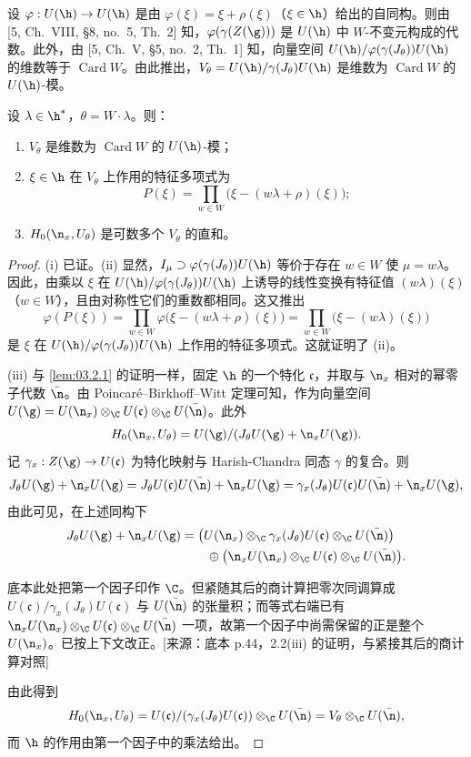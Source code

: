 设 $\varphi:U(\h)\to U(\h)$ 是由 $\varphi(\xi)=\xi+\rho(\xi)$（$\xi\in\h$）给出的自同构。则由 [5, Ch.~VIII, \S8, no.~5, Th.~2] 知，$\varphi(\gamma(Z(\g)))$ 是 $U(\h)$ 中 $W$-不变元构成的代数。此外，由 [5, Ch.~V, \S5, no.~2, Th.~1] 知，向量空间 $U(\h)/\varphi(\gamma(J_\theta))U(\h)$ 的维数等于 $\operatorname{Card}W$。由此推出，$V_\theta=U(\h)/\gamma(J_\theta)U(\h)$ 是维数为 $\operatorname{Card}W$ 的 $U(\h)$-模。

\begin{lemma}\label{lem:03.2.2}
设 $\lambda\in\h^*$，$\theta=W\cdot\lambda$。则：
\begin{enumerate}[label=(\roman*)]
\item $V_\theta$ 是维数为 $\operatorname{Card}W$ 的 $U(\h)$-模；
\item $\xi\in\h$ 在 $V_\theta$ 上作用的特征多项式为
$$P(\xi)=\prod_{w\in W}\bigl(\xi-(w\lambda+\rho)(\xi)\bigr);$$
\item $H_0(\n_x,U_\theta)$ 是可数多个 $V_\theta$ 的直和。
\end{enumerate}
\end{lemma}

\begin{proof}
(i) 已证。(ii) 显然，$I_\mu\supset\varphi(\gamma(J_\theta))U(\h)$ 等价于存在 $w\in W$ 使 $\mu=w\lambda$。因此，由乘以 $\xi$ 在 $U(\h)/\varphi(\gamma(J_\theta))U(\h)$ 上诱导的线性变换有特征值 $(w\lambda)(\xi)$（$w\in W$），且由对称性它们的重数都相同。这又推出
$$\varphi(P(\xi))=\prod_{w\in W}\varphi\bigl(\xi-(w\lambda+\rho)(\xi)\bigr)=\prod_{w\in W}\bigl(\xi-(w\lambda)(\xi)\bigr)$$
是 $\xi$ 在 $U(\h)/\varphi(\gamma(J_\theta))U(\h)$ 上作用的特征多项式。这就证明了 (ii)。

(iii) 与 \ref{lem:03.2.1} 的证明一样，固定 $\h$ 的一个特化 $\mathfrak{c}$，并取与 $\n_x$ 相对的幂零子代数 $\bar{\n}$。由 Poincaré--Birkhoff--Witt 定理可知，作为向量空间 $U(\g)=U(\n_x)\otimes_\C U(\mathfrak{c})\otimes_\C U(\bar{\n})$。此外
$$H_0(\n_x,U_\theta)=U(\g)/(J_\theta U(\g)+\n_xU(\g)).$$
记 $\gamma_x:Z(\g)\to U(\mathfrak{c})$ 为特化映射与 Harish-Chandra 同态 $\gamma$ 的复合。则
$$J_\theta U(\g)+\n_xU(\g)=J_\theta U(\mathfrak{c})U(\bar{\n})+\n_xU(\g)=\gamma_x(J_\theta)U(\mathfrak{c})U(\bar{\n})+\n_xU(\g),$$
由此可见，在上述同构下
\begin{align*}
J_\theta U(\g)+\n_xU(\g)
&=\bigl(U(\n_x)\otimes_\C\gamma_x(J_\theta)U(\mathfrak{c})\otimes_\C U(\bar{\n})\bigr)\\
&\qquad\oplus\bigl(\n_xU(\n_x)\otimes_\C U(\mathfrak{c})\otimes_\C U(\bar{\n})\bigr).
\end{align*}
\begin{annote}
底本此处把第一个因子印作 $\C$。但紧随其后的商计算把零次同调算成 $U(\mathfrak{c})/\gamma_x(J_\theta)U(\mathfrak{c})$ 与 $U(\bar{\n})$ 的张量积；而等式右端已有 $\n_xU(\n_x)\otimes_\C U(\mathfrak{c})\otimes_\C U(\bar{\n})$ 一项，故第一个因子中尚需保留的正是整个 $U(\n_x)$。已按上下文改正。[来源：底本 p.44，2.2(iii) 的证明，与紧接其后的商计算对照]
\end{annote}
由此得到
$$H_0(\n_x,U_\theta)=U(\mathfrak{c})/(\gamma_x(J_\theta)U(\mathfrak{c}))\otimes_\C U(\bar{\n})=V_\theta\otimes_\C U(\bar{\n}),$$
而 $\h$ 的作用由第一个因子中的乘法给出。
\end{proof}

